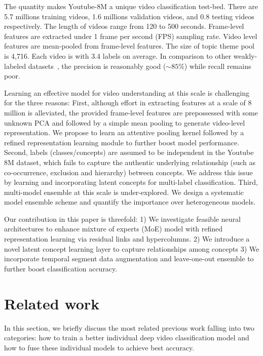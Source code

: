 \documentclass[10pt,twocolumn,letterpaper]{article}
\begin{document}
The quantity makes Youtube-8M a unique video classification test-bed. There are 5.7 millions training videos, 1.6 millions validation videos, and 0.8 testing videos respectively. The length of videos range from 120 to 500 seconds. Frame-level features are extracted under 1 frame per second (FPS) sampling rate. Video level features are mean-pooled from frame-level features. The size of topic theme pool is 4,716. Each video is with 3.4 labels on average. In comparison to other weakly-labeled datasets~\cite{jiang2017fcvid}, the precision is reasonably good ($\sim 85\%$) while recall remains poor.

Learning an effective model for video understanding at this scale is challenging for the three reasons:
First, although effort in extracting features at a scale of 8 million is alleviated, the provided frame-level features are prepossessed with some unknown PCA and followed by a simple mean pooling to generate video-level representation. We propose to learn an attentive pooling kernel followed by a refined representation learning module to further boost model performance. 
Second, labels (classes/concepts) are assumed to be independent in the Youtube 8M dataset, which fails to capture the authentic underlying relationship (such as co-occurrence, exclusion and hierarchy) between concepts. We address this issue by learning and incorporating latent concepts for multi-label classification.
Third, multi-model ensemble at this scale is under-explored. We design a systematic model ensemble scheme and quantify the importance over heterogeneous models.



    

Our contribution in this paper is threefold: 1) We investigate feasible neural architectures to enhance mixture of experts (MoE) model with refined representation learning via residual links and hypercolumns. 2) We introduce a novel latent concept learning layer to capture relationships among concepts 3) We incorporate temporal segment data augmentation and leave-one-out ensemble to further boost classification accuracy.



\section{Related work}
In this section, we briefly discuss the most related previous work falling into two categories: how to train a better individual deep video classification model and how to fuse these individual models to achieve best accuracy. 
\end{document}
